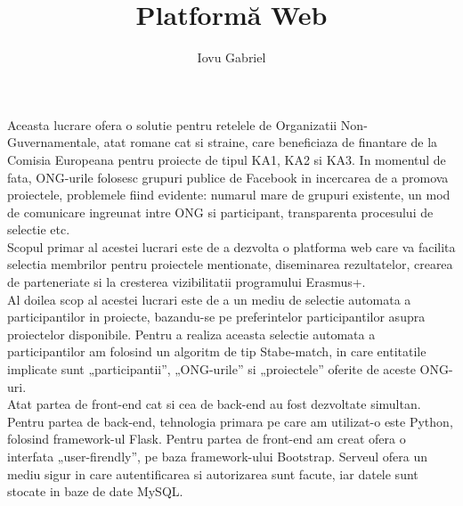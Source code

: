 \documentclass[]{scrartcl}
\date{}
\title{Platform\u{a} Web}
\author{Iovu Gabriel}
\newcommand\tab[1][0.7cm]{\hspace*{#1}}
\begin{document}
\maketitle



\tab Aceasta lucrare ofera o solutie pentru retelele de Organizatii Non-Guvernamentale, atat romane cat si straine, care beneficiaza de finantare de la Comisia Europeana pentru proiecte de tipul KA1, KA2 si KA3. In momentul de fata, ONG-urile folosesc grupuri publice de Facebook in incercarea de a promova proiectele, problemele fiind evidente: numarul mare de grupuri existente, un mod de comunicare ingreunat intre ONG si participant, transparenta procesului de selectie etc. \\
\tab Scopul primar al acestei lucrari este de a dezvolta o platforma web care va facilita selectia membrilor pentru proiectele mentionate, diseminarea rezultatelor, crearea de parteneriate si la cresterea vizibilitatii programului Erasmus+. \\
\tab Al doilea scop al acestei lucrari este de a un mediu de selectie automata a participantilor in proiecte, bazandu-se pe preferintelor participantilor asupra proiectelor disponibile. Pentru a realiza aceasta selectie automata a participantilor am folosind un algoritm de tip Stabe-match, in care entitatile implicate sunt „participantii”, „ONG-urile” si „proiectele” oferite de aceste ONG-uri. \\
\tab Atat partea de front-end cat si cea de back-end au fost dezvoltate simultan. Pentru partea de back-end, tehnologia primara pe care am utilizat-o este Python, folosind framework-ul Flask. Pentru partea de front-end am creat ofera o interfata „user-firendly”, pe baza framework-ului Bootstrap. Serveul ofera un mediu sigur in care autentificarea si autorizarea sunt facute, iar datele sunt stocate in baze de date MySQL.
\end{document}
